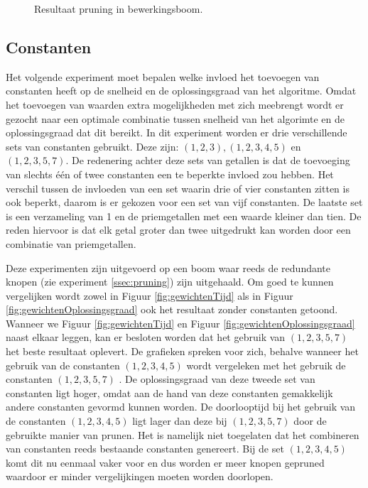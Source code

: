 \documentclass[Main.tex]{subfiles}
\begin{document}
\begin{figure}[!htb]
\centering
{}
\caption{Resultaat pruning in bewerkingsboom.} \label{fig:pruningInBewerkingsboom}
\end{figure}

\subsection{Constanten} \label{ssec:constanten}
Het volgende experiment moet bepalen welke invloed het toevoegen van constanten heeft op de snelheid en de oplossingsgraad van het algoritme. Omdat het toevoegen van waarden extra mogelijkheden met zich meebrengt wordt er gezocht naar een optimale combinatie tussen snelheid van het algorimte en de oplossingsgraad dat dit bereikt. In dit experiment worden er drie verschillende sets van constanten gebruikt. Deze zijn: $(1,2,3), (1,2,3,4,5)$ en $(1,2,3,5,7)$. De redenering achter deze sets van getallen is dat de toevoeging van slechts \'e\'en of twee constanten een te beperkte invloed zou hebben. Het verschil tussen de invloeden van een set waarin drie of vier constanten zitten is ook beperkt, daarom is er gekozen voor een set van vijf constanten. De laatste set is een verzameling van 1 en de priemgetallen met een waarde kleiner dan tien. De reden hiervoor is dat elk getal groter dan twee uitgedrukt kan worden door een combinatie van priemgetallen.
\par Deze experimenten zijn uitgevoerd op een boom waar reeds de redundante knopen (zie experiment \ref{ssec:pruning}) zijn uitgehaald. Om goed te kunnen vergelijken wordt zowel in Figuur \ref{fig:gewichtenTijd} als in Figuur \ref{fig:gewichtenOplossingsgraad} ook het resultaat zonder constanten getoond. Wanneer we Figuur \ref{fig:gewichtenTijd} en Figuur \ref{fig:gewichtenOplossingsgraad} naast elkaar leggen, kan er besloten worden dat het gebruik van $(1,2,3,5,7)$ het beste resultaat oplevert. De grafieken spreken voor zich, behalve wanneer het gebruik van de constanten $(1, 2, 3, 4, 5)$  wordt vergeleken met het gebruik de constanten $(1, 2, 3, 5, 7)$ . De oplossingsgraad van deze tweede set van constanten ligt hoger, omdat aan de hand van deze constanten gemakkelijk andere constanten gevormd kunnen worden. De doorlooptijd bij het gebruik van de constanten $(1, 2, 3, 4, 5)$ ligt lager dan deze bij $(1,2,3,5,7)$ door de gebruikte manier van prunen. Het is namelijk niet toegelaten dat het combineren van constanten reeds bestaande constanten genereert. Bij de set $(1, 2, 3, 4, 5)$ komt dit nu eenmaal vaker voor en dus worden er meer knopen gepruned waardoor er minder vergelijkingen moeten worden doorlopen.
\end{document}
